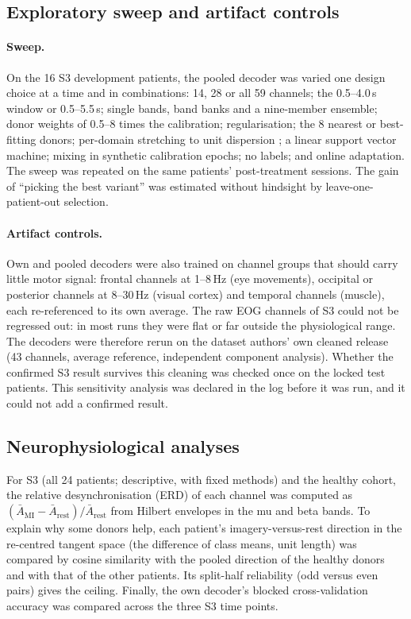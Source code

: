 \documentclass[11pt]{article}
\begin{document}
\subsection{Exploratory sweep and artifact controls}
\label{sec:sweep-method}

\paragraph{Sweep.} On the 16 S3 development patients, the pooled decoder was varied one design choice at a time and in combinations: 14, 28 or all 59 channels; the 0.5--4.0\,s window or 0.5--5.5\,s; single bands, band banks and a nine-member ensemble; donor weights of 0.5--8 times the calibration; regularisation; the 8 nearest or best-fitting donors; per-domain stretching to unit dispersion \citep{rodrigues2019}; a linear support vector machine; mixing in synthetic calibration epochs; no labels; and online adaptation. The sweep was repeated on the same patients' post-treatment sessions. The gain of ``picking the best variant'' was estimated without hindsight by leave-one-patient-out selection.

\paragraph{Artifact controls.} Own and pooled decoders were also trained on channel groups that should carry little motor signal: frontal channels at 1--8\,Hz (eye movements), occipital or posterior channels at 8--30\,Hz (visual cortex) and temporal channels (muscle), each re-referenced to its own average. The raw EOG channels of S3 could not be regressed out: in most runs they were flat or far outside the physiological range. The decoders were therefore rerun on the dataset authors' own cleaned release (43 channels, average reference, independent component analysis). Whether the confirmed S3 result survives this cleaning was checked once on the locked test patients. This sensitivity analysis was declared in the log before it was run, and it could not add a confirmed result.

\subsection{Neurophysiological analyses}

For S3 (all 24 patients; descriptive, with fixed methods) and the healthy cohort, the relative desynchronisation (ERD) of each channel was computed as $(\bar A_{\mathrm{MI}} - \bar A_{\mathrm{rest}}) / \bar A_{\mathrm{rest}}$ from Hilbert envelopes in the mu and beta bands. To explain why some donors help, each patient's imagery-versus-rest direction in the re-centred tangent space (the difference of class means, unit length) was compared by cosine similarity with the pooled direction of the healthy donors and with that of the other patients. Its split-half reliability (odd versus even pairs) gives the ceiling. Finally, the own decoder's blocked cross-validation accuracy was compared across the three S3 time points.
\end{document}
